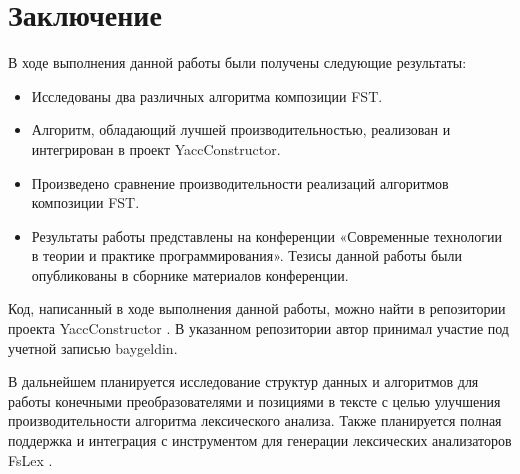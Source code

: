 \section*{Заключение}
В ходе выполнения данной работы были получены следующие результаты:

\begin{itemize}
  \item Исследованы два различных алгоритма композиции FST.
  \item Алгоритм, обладающий лучшей производительностью, реализован и интегрирован в проект YaccConstructor.
  \item Произведено сравнение производительности реализаций алгоритмов композиции FST.
  \item Результаты работы представлены на конференции «Современные технологии в теории и практике программирования». Тезисы данной работы были опубликованы в сборнике материалов конференции.
\end{itemize} 

Код, написанный в ходе выполнения данной работы, можно найти в репозитории проекта YaccConstructor \cite{yacc_git}. В указанном репозитории автор принимал участие под учетной записью baygeldin.

В дальнейшем планируется исследование структур данных и алгоритмов для работы конечными преобразователями и позициями в тексте с целью улучшения производительности алгоритма лексического анализа. Также планируется полная поддержка и интеграция с инструментом для генерации лексических анализаторов FsLex \cite{fslex}.


